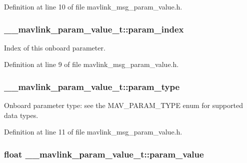 Definition at line 10 of file mavlink\-\_\-msg\-\_\-param\-\_\-value.\-h.

\hypertarget{struct____mavlink__param__value__t_a213d71adbd95b241f962dd1d375c3a5a}{
\subsubsection[{param\-\_\-index}]{ \-\_\-\-\_\-mavlink\-\_\-param\-\_\-value\-\_\-t\-::param\-\_\-index}}\label{struct____mavlink__param__value__t_a213d71adbd95b241f962dd1d375c3a5a}


Index of this onboard parameter. 



Definition at line 9 of file mavlink\-\_\-msg\-\_\-param\-\_\-value.\-h.

\hypertarget{struct____mavlink__param__value__t_a825cfefbe7cfd71991186c4ffc897447}{
\subsubsection[{param\-\_\-type}]{ \-\_\-\-\_\-mavlink\-\_\-param\-\_\-value\-\_\-t\-::param\-\_\-type}}\label{struct____mavlink__param__value__t_a825cfefbe7cfd71991186c4ffc897447}


Onboard parameter type\-: see the M\-A\-V\-\_\-\-P\-A\-R\-A\-M\-\_\-\-T\-Y\-P\-E enum for supported data types. 



Definition at line 11 of file mavlink\-\_\-msg\-\_\-param\-\_\-value.\-h.

\hypertarget{struct____mavlink__param__value__t_acd7d6401383f92dac17a95946b501a50}{
\subsubsection[{param\-\_\-value}]{\setlength{\rightskip}{0pt plus 5cm}float \-\_\-\-\_\-mavlink\-\_\-param\-\_\-value\-\_\-t\-::param\-\_\-value}}\label{struct____mavlink__param__value__t_acd7d6401383f92dac17a95946b501a50}


